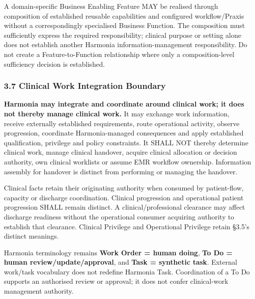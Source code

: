 \label{rad:metamodel:171}

A domain-specific Business Enabling Feature MAY be realised through composition of established reusable capabilities and configured workflow/\allowbreak{}Praxis without a correspondingly specialised Business Function. The composition must sufficiently express the required responsibility; clinical purpose or setting alone does not establish another Harmonia information-management responsibility. Do not create a Feature-to-Function relationship where only a composition-level sufficiency decision is established.

\label{rad:metamodel:173}
\subsubsection*{3.7 Clinical Work Integration Boundary}
\label{rad:metamodel:175}

\textbf{Harmonia may integrate and coordinate around clinical work; it does not thereby manage clinical work.} It may exchange work information, receive externally established requirements, route operational activity, observe progression, coordinate Harmonia-managed consequences and apply established qualification, privilege and policy constraints. It SHALL NOT thereby determine clinical work, manage clinical handover, acquire clinical allocation or decision authority, own clinical worklists or assume EMR workflow ownership. Information assembly for handover is distinct from performing or managing the handover.

\label{rad:metamodel:177}

Clinical facts retain their originating authority when consumed by patient-flow, capacity or discharge coordination. Clinical progression and operational patient progression SHALL remain distinct. A clinical/\allowbreak{}professional clearance may affect discharge readiness without the operational consumer acquiring authority to establish that clearance. Clinical Privilege and Operational Privilege retain §3.5's distinct meanings.

\label{rad:metamodel:179}

Harmonia terminology remains \textbf{Work Order = human doing}, \textbf{To Do = human review/\allowbreak{}update/\allowbreak{}approval}, and \textbf{Task = synthetic task}. External work/\allowbreak{}task vocabulary does not redefine Harmonia Task. Coordination of a To Do supports an authorised review or approval; it does not confer clinical-work management authority.

